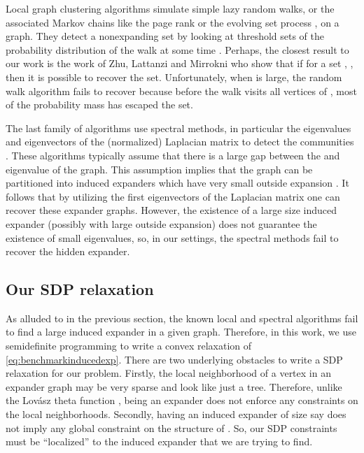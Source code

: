 \documentclass[11pt]{article}
\begin{document}
Local graph clustering algorithms \cite{ST08,ACL06,AP09,OT12,ZLM13} simulate simple lazy random walks, or the associated Markov chains like the page rank \cite{ACL06} or the evolving set process \cite{MP03}, on a graph. They detect a nonexpanding set by looking at threshold sets of the probability distribution of the walk at some time .
Perhaps, the closest result to our work is the  work of Zhu, Lattanzi and Mirrokni \cite{ZLM13} who show that if for a set , ,   then it is possible to recover the set. Unfortunately, when  is large, the random walk algorithm fails to recover  because before the walk visits all vertices of , most of the probability mass has escaped the set.

The last family of algorithms use spectral methods, in particular the eigenvalues and eigenvectors of the (normalized) Laplacian matrix to detect the communities \cite{LOT12,LRTV11,OT14,DPRS14,PSZ15,Sin16}. These algorithms typically assume that there is a large gap between the  and  eigenvalue of the graph. This assumption implies that the graph can be partitioned into induced expanders which have very small outside expansion \cite{OT14}. It follows that by utilizing the first  eigenvectors of the Laplacian matrix one can recover these expander graphs. However, the existence of a large size induced expander (possibly with large outside expansion) does not  guarantee the existence of small eigenvalues, so, in our settings, the spectral methods fail to recover the hidden expander.




\subsection{Our SDP relaxation}
As alluded to in the previous section, the known local and spectral algorithms fail to find a large induced expander in a given graph. Therefore, in this work, we use semidefinite programming to write a convex relaxation of \eqref{eq:benchmarkinducedexp}. 
There are two underlying obstacles to write a SDP relaxation for our problem. Firstly, the local neighborhood of a vertex in an expander graph may be very sparse and look like just a tree. Therefore, unlike the Lov\'asz theta function \cite{Lov79},  being an expander does not enforce any constraints on the local neighborhoods. 
Secondly, having an induced expander of size say  does not imply any global constraint on the structure of . So, our SDP constraints must be ``localized''   to the induced expander that we are trying to find.
\end{document}
